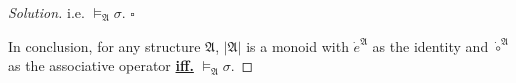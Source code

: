 \documentclass{article}
\newenvironment{solution}{\begin{proof}[\noindent\it Solution]}{\end{proof}}
\newcommand{\whiteqed}{\hfill $\square$\par}
\begin{document}
\begin{solution}
    \hspace{2.6em}
    i.e. $\vDash_\mathfrak{A} \sigma$.
    \whiteqed

    \vspace{1em} \hspace{2.6em}
    In conclusion, for any structure $\mathfrak{A}$, $|\mathfrak{A}|$ is a monoid with $\dot{e}^{\mathfrak{A}}$ as the identity and $\dot{\circ}^{\mathfrak{A}}$ as the associative operator \underline{\textbf{iff.}} $\vDash_\mathfrak{A}\sigma$.
\end{solution}
\end{document}
